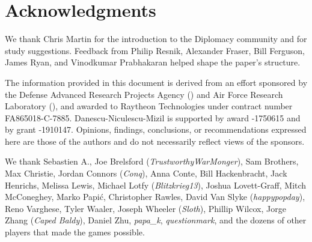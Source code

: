 \section*{Acknowledgments}

We thank Chris Martin for the introduction to the Diplomacy community and for study suggestions.  Feedback from Philip Resnik, Alexander Fraser, Bill Ferguson, James Ryan, and Vinodkumar Prabhakaran helped shape the paper's structure.  


%
The information provided in this document is derived from an effort
sponsored by the Defense Advanced Research Projects Agency
() and Air Force Research Laboratory (), and
awarded to Raytheon  Technologies under contract number
FA865018-C-7885.
%
Danescu-Niculescu-Mizil is supported by  award
-1750615 and by  grant -1910147.
%
Opinions, findings, conclusions, or recommendations expressed here
are those of the authors and do not necessarily reflect views of
the sponsors.

We thank Sebastien A., Joe Brelsford (\textit{TrustworthyWarMonger}),
Sam Brothers,  Max Christie, Jordan Connors
(\textit{Conq}), Anna Conte, Bill Hackenbracht, Jack Henrichs, Melissa Lewis, Michael Lotfy
(\textit{Blitzkrieg13}), Joshua Lovett-Graff, Mitch McConeghey, Marko
Papi\'c, Christopher Rawles, David Van Slyke (\textit{happypopday}), Reno Varghese, Tyler Waaler, Joseph
Wheeler (\textit{Sloth}), Phillip Wilcox, Jorge Zhang (\textit{Caped
  Baldy}), Daniel Zhu, \textit{papa\_k}, \textit{questionmark}, and
the dozens of other players that made the games possible.  
